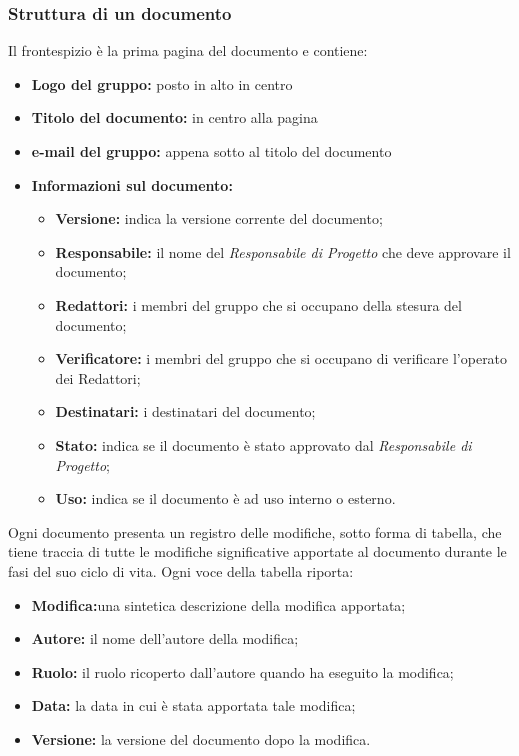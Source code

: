         \subsubsection{Struttura di un documento}
            Il frontespizio è la prima pagina del documento e contiene:
            \begin{itemize}
                \item \textbf{Logo del gruppo:} posto in alto in centro
                \item \textbf{Titolo del documento:} in centro alla pagina
                \item \textbf{e-mail del gruppo:} appena sotto al titolo del documento
                \item \textbf{Informazioni sul documento:}
                    \begin{itemize}
                        \item \textbf{Versione:} indica la versione corrente del documento;
                        \item \textbf{Responsabile:} il nome del \textit{Responsabile di Progetto} che deve approvare il documento;
                        \item \textbf{Redattori:} i membri del gruppo che si occupano della stesura del documento; 
                        \item \textbf{Verificatore:} i membri del gruppo che si occupano di verificare l'operato dei Redattori;
                        \item \textbf{Destinatari:} i destinatari del documento;
                        \item \textbf{Stato:} indica se il documento è stato approvato dal \textit{Responsabile di Progetto};
                        \item \textbf{Uso:} indica se il documento è ad uso interno o esterno.
                    \end{itemize} 
            \end{itemize}
            Ogni documento presenta un registro delle modifiche, sotto forma di tabella, che tiene traccia di tutte le modifiche significative apportate al documento durante le fasi del suo ciclo di vita. Ogni voce della tabella riporta:
            \begin{itemize}
                \item \textbf{Modifica:}una sintetica descrizione della modifica apportata;
                \item \textbf{Autore:} il nome dell’autore della modifica;
                \item \textbf{Ruolo:} il ruolo ricoperto dall’autore quando ha eseguito la modifica;
                \item \textbf{Data:} la data in cui è stata apportata tale modifica;
                \item \textbf{Versione:} la versione del documento dopo la modifica.
            \end{itemize}
